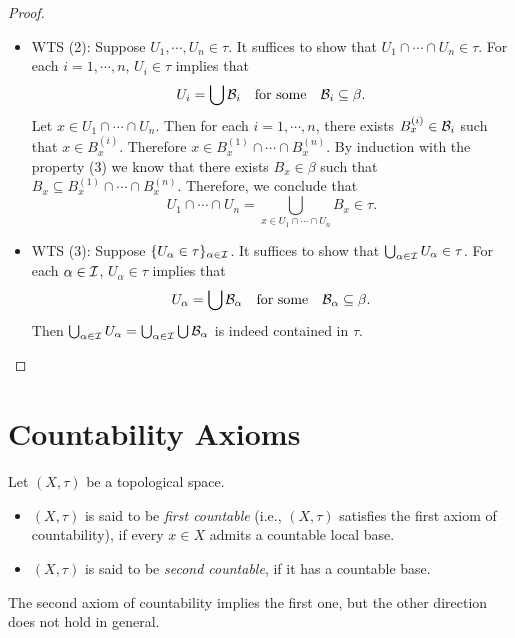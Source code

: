 \documentclass{techreport}
\begin{document}
\begin{proof}
\begin{itemize}
\begin{itemize}
			\item WTS (2):
			Suppose $U_1,\cdots,U_n \in \tau$.
			It suffices to show that $U_1 \cap \cdots \cap U_n \in \tau$.
			For each $i=1,\cdots,n$, $U_i \in \tau$ implies that
			\[
			U_i = \bigcup \mathcal{B}_i \quad \text{for some} \quad \mathcal{B}_i \subseteq \beta.
			\]
			Let $x \in U_1 \cap \cdots \cap U_n$.
			Then for each $i=1,\cdots,n$, there exists $B_x^{(i)} \in \mathcal{B}_i$ such that $x \in B_x^{(i)}$.
			Therefore $x \in B_x^{(1)} \cap \cdots \cap B_x^{(n)}$.
			By induction with the property (3) we know that there exists $B_x \in \beta$ such that $B_x \subseteq B_x^{(1)} \cap \cdots \cap B_x^{(n)}$.
			Therefore, we conclude that
			\[
			U_1 \cap \cdots \cap U_n = \bigcup_{x \in U_1 \cap \cdots \cap U_n} B_x \in \tau.
			\]
			
			\item WTS (3):
			Suppose $\{U_\alpha \in \tau\}_{\alpha \in \mathcal{I}}$.
			It suffices to show that $\bigcup_{\alpha \in \mathcal{I}} U_\alpha \in \tau$.
			For each $\alpha \in \mathcal{I}$, $U_\alpha \in \tau$ implies that
			\[
			U_\alpha = \bigcup \mathcal{B}_\alpha \quad \text{for some} \quad \mathcal{B}_\alpha \subseteq \beta.
			\]
			Then $\bigcup_{\alpha \in \mathcal{I}} U_\alpha = \bigcup_{\alpha \in \mathcal{I}} \bigcup \mathcal{B}_\alpha$ is indeed contained in $\tau$.
		\end{itemize}
	\end{itemize}
\end{proof}

\section{Countability Axioms}

\begin{definition}\label{De:AxiomsOfCountability}
	Let $(X,\tau)$ be a topological space.
	\begin{itemize}
		\item $(X,\tau)$ is said to be \emph{first countable} (i.e., $(X,\tau)$ satisfies the first axiom of countability), if every $x \in X$ admits a countable local base.
		\item $(X,\tau)$ is said to be \emph{second countable}, if it has a countable base.
	\end{itemize}
\end{definition}

\begin{remark}\label{Rem:SndAxCountImplyFstAx}
	The second axiom of countability implies the first one, but the other direction does not hold in general.
\end{remark}
\end{document}
